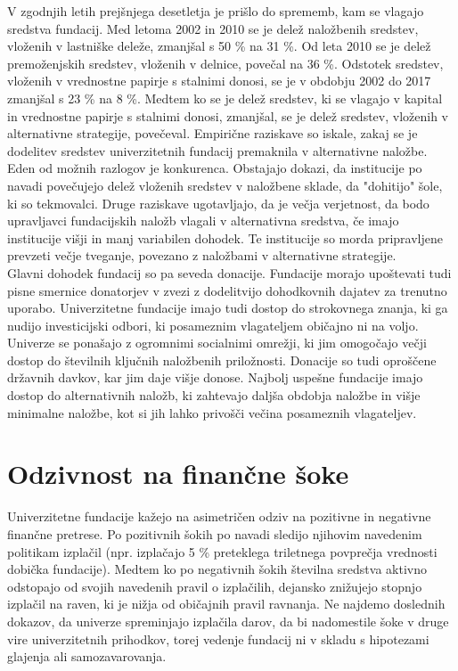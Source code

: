 \documentclass[12pt, a4paper]{article}
\begin{document}
V zgodnjih letih prejšnjega desetletja je prišlo do sprememb, kam se vlagajo sredstva fundacij. Med letoma 2002 in 2010 se je delež naložbenih sredstev, vloženih v lastniške deleže, zmanjšal s 50 \% na 31 \%. Od leta 2010 se je delež premoženjskih sredstev, vloženih v delnice, povečal na 36 \%. Odstotek sredstev, vloženih v vrednostne papirje s stalnimi donosi, se je v obdobju 2002 do 2017 zmanjšal s 23 \% na 8 \%. Medtem ko se je delež sredstev, ki se vlagajo v kapital in vrednostne papirje s stalnimi donosi, zmanjšal, se je delež sredstev, vloženih v alternativne strategije, povečeval. Empirične raziskave so iskale, zakaj se je dodelitev sredstev univerzitetnih fundacij premaknila v alternativne naložbe. Eden od možnih razlogov je konkurenca. Obstajajo dokazi, da institucije po navadi povečujejo delež vloženih sredstev v naložbene sklade, da "dohitijo" šole, ki so tekmovalci. Druge raziskave ugotavljajo, da je večja verjetnost, da bodo upravljavci fundacijskih naložb vlagali v alternativna sredstva, če imajo institucije višji in manj variabilen dohodek. Te institucije so morda pripravljene prevzeti večje tveganje, povezano z naložbami v alternativne strategije.\cite{investment2}\\

Glavni dohodek fundacij so pa seveda donacije. Fundacije morajo upoštevati tudi pisne smernice donatorjev v zvezi z dodelitvijo dohodkovnih dajatev za trenutno uporabo. Univerzitetne fundacije imajo tudi dostop do strokovnega znanja, ki ga nudijo investicijski odbori, ki posameznim vlagateljem običajno ni na voljo. Univerze se ponašajo z ogromnimi socialnimi omrežji, ki jim omogočajo večji dostop do številnih ključnih naložbenih priložnosti.
Donacije so tudi oproščene državnih davkov, kar jim daje višje donose. Najbolj uspešne fundacije imajo dostop do alternativnih naložb, ki zahtevajo daljša obdobja naložbe in višje minimalne naložbe, kot si jih lahko privošči večina posameznih vlagateljev. \cite{Investopedia2}

\section[Odzivnost na finančne šoke]{Odzivnost na finančne šoke}

Univerzitetne fundacije kažejo na asimetričen odziv na pozitivne in negativne finančne pretrese. Po pozitivnih šokih po navadi sledijo njihovim navedenim politikam izplačil (npr. izplačajo 5 \% preteklega triletnega povprečja vrednosti dobička fundacije). Medtem ko po negativnih šokih številna sredstva aktivno odstopajo od svojih navedenih pravil o izplačilih, dejansko znižujejo stopnjo izplačil na raven, ki je nižja od običajnih pravil ravnanja. Ne najdemo doslednih dokazov, da univerze spreminjajo izplačila darov, da bi nadomestile šoke v druge vire univerzitetnih prihodkov, torej vedenje fundacij ni v skladu s hipotezami glajenja ali samozavarovanja.\\
\end{document}
